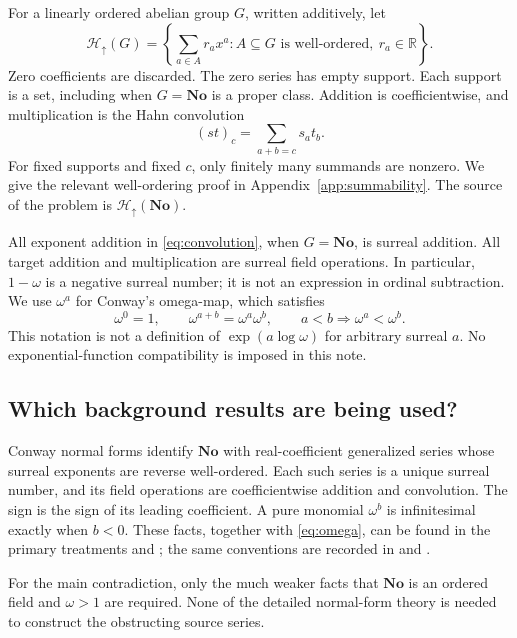 \documentclass[11pt,letterpaper]{article}
\theoremstyle{definition}
\theoremstyle{remark}
\newcommand{\No}{\mathbf{No}}
\newcommand{\R}{\mathbb R}
\newcommand{\Hu}[1]{\mathcal H_{\uparrow}(#1)}
\newcommand{\Hfull}{\mathcal H_{\uparrow}(\No)}
\begin{document}
For a linearly ordered abelian group $G$, written additively, let
\[
 \Hu{G}=\left\{\sum_{a\in A} r_a x^a:
  A\subseteq G\text{ is well-ordered},\ r_a\in\R\right\}.
\]
Zero coefficients are discarded. The zero series has empty support. Each
support is a set, including when $G=\No$ is a proper class. Addition is
coefficientwise, and multiplication is the Hahn convolution
\begin{equation}\label{eq:convolution}
 (st)_c=\sum_{a+b=c}s_a t_b.
\end{equation}
For fixed supports and fixed $c$, only finitely many summands are nonzero.
We give the relevant well-ordering proof in Appendix~\ref{app:summability}.
The source of the problem is $\Hfull$.

All exponent addition in \eqref{eq:convolution}, when $G=\No$, is surreal
addition. All target addition and multiplication are surreal field operations.
In particular, $1-\omega$ is a negative surreal number; it is not an expression
in ordinal subtraction. We use $\omega^a$ for Conway's omega-map, which satisfies
\begin{equation}\label{eq:omega}
 \omega^0=1,\qquad \omega^{a+b}=\omega^a\omega^b,
 \qquad a<b\Longrightarrow \omega^a<\omega^b.
\end{equation}
This notation is not a definition of $\exp(a\log\omega)$ for arbitrary surreal
$a$. No exponential-function compatibility is imposed in this note.

\subsection{Which background results are being used?}
Conway normal forms identify $\No$ with real-coefficient generalized series
whose surreal exponents are reverse well-ordered. Each such series is a unique
surreal number, and its field operations are coefficientwise addition and
convolution. The sign is the sign of its leading coefficient. A pure monomial
$\omega^b$ is infinitesimal exactly when $b<0$. These facts, together with
\eqref{eq:omega}, can be found in the primary treatments
\citep[pp.~175--176]{DriesEhrlich2001} and
\citep[Sections 2.3--2.6]{BerarducciMantova2018}; the same conventions are
recorded in \citep[Sections 1 and 2]{KKS} and \citep{BG}.

For the main contradiction, only the much weaker facts that $\No$ is an
ordered field and $\omega>1$ are required. None of the detailed normal-form
theory is needed to construct the obstructing source series.
\end{document}
